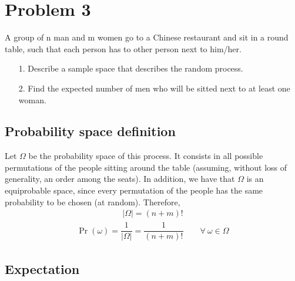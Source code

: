 
\section{Problem 3}

A group of n man and m women go to a Chinese restaurant and sit in a round table,
such that each person has to other person next to him/her.
\begin{itemize}
	\item[1.] Describe a sample space that describes the random process.
	\item[2.] Find the expected number of men who will be sitted next to at least one woman.
\end{itemize} 


\subsection{Probability space definition}

Let $\Omega$ be the probability space of this process. It consists in all possible permutations of the people sitting around the table (assuming, without loss of generality, an order among the seats). In addition, we have that $\Omega$ is an equiprobable space, since every permutation of the people has the same probability to be chosen (at random). Therefore,
\begin{align*}
	|\Omega| = (n+m)!
\end{align*}
\begin{align*}
	\Pr(\omega) = \dfrac{1}{|\Omega|} = \dfrac{1}{(n+m)!} \qquad \forall \ \omega\in\Omega
\end{align*}


\subsection{Expectation}

